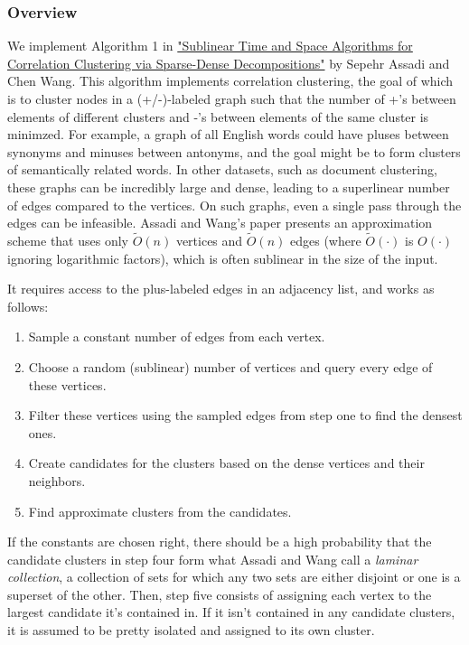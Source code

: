 \documentclass[
]{article}
\providecommand{\tightlist}{%
  \setlength{\itemsep}{0pt}\setlength{\parskip}{0pt}}
\begin{document}
\hypertarget{overview}{%
  \subsubsection{Overview}\label{overview}}

We implement Algorithm 1 in
\href{https://doi.org/10.48550/arxiv.2109.14528}{"Sublinear Time and
  Space Algorithms for Correlation Clustering via Sparse-Dense
  Decompositions"} by Sepehr Assadi and Chen Wang. This algorithm implements
correlation clustering, the goal of which is to cluster nodes in a (+/-)-labeled
graph such that the number of +'s between elements of different clusters and
-'s between elements of the same cluster is minimzed. For example, a graph of
all English words could have pluses between synonyms and minuses between
antonyms, and the goal might be to form clusters of semantically related words.
In other datasets, such as document clustering, these graphs can be
incredibly large and dense, leading to a superlinear number of edges
compared to the vertices. On such graphs, even a single pass through the edges can be
infeasible. Assadi and Wang's paper presents an approximation scheme
that uses only {\(\tilde{O}(n)\)} vertices and {\(\tilde{O}(n)\)} edges
(where $\tilde{O}(\cdot)$ is $O(\cdot)$ ignoring logarithmic factors),
which is often sublinear in the size of the input.

It requires access to the plus-labeled edges in an adjacency list, and
works as follows:

\begin{enumerate}
  \tightlist
  \item
        Sample a constant number of edges from each vertex.
  \item
        Choose a random (sublinear) number of vertices and query every edge of
        these vertices.
  \item
        Filter these vertices using the sampled edges from step one to find
        the densest ones.
  \item
        Create candidates for the clusters based on the dense vertices and
        their neighbors.
  \item
        Find approximate clusters from the candidates.
\end{enumerate}

If the constants are chosen right, there should be a high probability
that the candidate clusters in step four form what Assadi and Wang call
a \emph{laminar collection}, a collection of sets for which any two sets
are either disjoint or one is a superset of the other. Then,
step five consists of assigning each vertex to the largest candidate
it's contained in. If it isn't contained
in any candidate clusters, it is assumed to be pretty isolated and
assigned to its own cluster.
\end{document}
